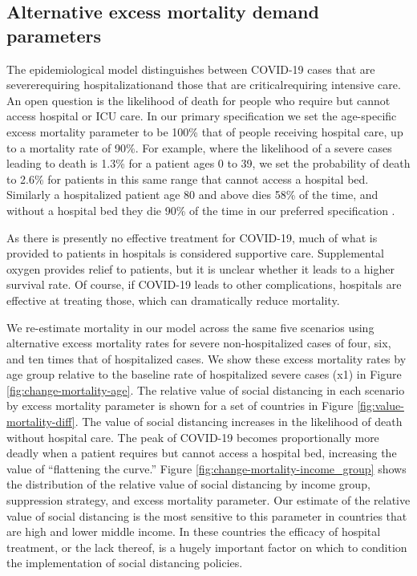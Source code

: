 \documentclass[11pt]{article}
\begin{document}
\newpage
\subsection{Alternative excess mortality demand parameters}
\label{sec:alt-mortality}

The epidemiological model distinguishes between COVID-19 cases that are severe\textemdash requiring hospitalization\textemdash and those that are critical\textemdash requiring intensive care. An open question is the likelihood of death for people who require but cannot access hospital or ICU care. In our primary specification we set the age-specific excess mortality parameter to be 100\% that of people receiving hospital care, up to a mortality rate of 90\%. For example, where the likelihood of a severe cases leading to death is 1.3\% for a patient ages 0 to 39, we set the probability of death to 2.6\% for patients in this same range that cannot access a hospital bed. Similarly a hospitalized patient age 80 and above dies 58\% of the time, and without a hospital bed they die 90\% of the time in our preferred specification \parencite{verity2020,squire}. 

As there is presently no effective treatment for COVID-19, much of what is provided to patients in hospitals is considered supportive care. Supplemental oxygen provides relief to patients, but it is unclear whether it leads to a higher survival rate. Of course, if COVID-19 leads to other complications, hospitals are effective at treating those, which can dramatically reduce mortality.

We re-estimate mortality in our model across the same five scenarios using alternative excess mortality rates for severe non-hospitalized cases of four, six, and ten times that of hospitalized cases. We show these excess mortality rates by age group relative to the baseline rate of hospitalized severe cases (x1) in Figure \ref{fig:change-mortality-age}. The relative value of social distancing in each scenario by excess mortality parameter is shown for a set of countries in Figure \ref{fig:value-mortality-diff}. The value of social distancing increases in the likelihood of death without hospital care. The peak of COVID-19 becomes proportionally more deadly when a patient requires but cannot access a hospital bed, increasing the value of ``flattening the curve.'' Figure \ref{fig:change-mortality-income_group} shows the distribution of the relative value of social distancing by income group, suppression strategy, and excess mortality parameter. Our estimate of the relative value of social distancing is the most sensitive to this parameter in countries that are high and lower middle income. In these countries the efficacy of hospital treatment, or the lack thereof, is a hugely important factor on which to condition the implementation of social distancing policies.
\end{document}
